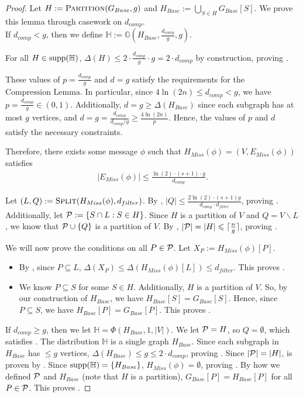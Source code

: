\documentclass[11pt]{article}
\begin{document}
\begin{proof}
Let $H:=\textnormal{\textsc{Partition}}(G_{Base}, g)$ and $H_{Base}:=\bigcup_{S\in H}G_{Base}[S]$. We prove this lemma through casework on $d_{comp}$.\\

If $d_{comp}<g$, then we define $\mathbb{H}:=\mathbb{G}\left(H_{Base}, \frac {d_{comp}}g, g\right)$. 

For all $H\in \textnormal{\text{supp}}(\mathbb{H})$, $\Delta{(H)}\le 2\cdot \frac {d_{comp}}g\cdot g=2\cdot d_{comp}$ by construction, proving . 

These values of $p=\frac {d_{comp}}g$ and $d=g$ satisfy the requirements for the $\hyperref[compression]{\text{Compression Lemma}}$. In particular, since $4\ln(2n)\le d_{comp}<g$, we have $p=\frac {d_{comp}}g\in (0, 1)$. Additionally, $d=g\ge \Delta{(H_{Base})}$ since each subgraph has at most $g$ vertices, and $d=g= \frac {d_{comp}}{d_{comp}/g}\ge \frac {4\ln (2n)}p$. Hence, the values of $p$ and $d$ satisfy the necessary constraints. 

Therefore, there exists some message $\phi$ such that $H_{Miss}(\phi)=(V, E_{Miss}(\phi))$ satisfies 
\begin{align*}
    |E_{Miss}(\phi)|\le \frac{\ln(2)\cdot (s+1)\cdot g}{d_{comp}}.
\end{align*}

Let $(L, Q):=\textnormal{\textsc{Split}}(H_{Miss}(\phi), d_{filter})$. By , $|Q|\le \frac{2\ln(2)\cdot (s+1)g}{d_{comp}\cdot d_{filter}}$, proving . Additionally, let  $\mathcal{P}:=\{S\cap L:S\in H\}$. Since $H$ is a partition of $V$ and $Q=V\backslash L$, we know that $\mathcal{P}\cup \{Q\}$ is a partition of $V$. By , $|\mathcal{P}|=|H|\leqslant \lceil\frac ng\rceil$, proving .

We will now prove the conditions on all $P\in \mathcal{P}$. Let $X_P:=H_{Miss}(\phi)[P]$. 
\begin{itemize}
    \item By , since $P\subseteq L$, $\Delta{(X_P)}\le \Delta{(H_{Miss}(\phi)[L])}\le d_{filter}$. This proves .
    \item We know $P\subseteq S$ for some $S\in H$. Additionally, $H$ is a partition of $V$. So, by our construction of $H_{Base}$, we have $H_{Base}[S]=G_{Base}[S]$. Hence, since $P\subseteq S$, we have $H_{Base}[P]=G_{Base}[P]$. This proves .
\end{itemize}

If $d_{comp}\ge g$, then we let $\mathbb{H}=\Phi(H_{Base}, 1, |V|)$. We let $\mathcal{P}=H$, so $Q=\emptyset$, which satisfies . The distribution $\mathbb{H}$ is a single graph $H_{Base}$. Since each subgraph in $H_{Base}$ has $\le g$ vertices, $\Delta{(H_{Base})}\le g\le 2\cdot d_{comp}$, proving . Since $|\mathcal{P}|=|H|$,  is proven by . Since $\textnormal{\text{supp}}(\mathbb{H})=\{H_{Base}\}$, $H_{Miss}(\phi)=\emptyset$, proving . By how we defined $\mathcal{P}$ and $H_{Base}$ (note that $H$ is a partition), $G_{Base}[P]=H_{Base}[P]$ for all $P\in \mathcal{P}$. This proves . 
\end{proof}
\end{document}
